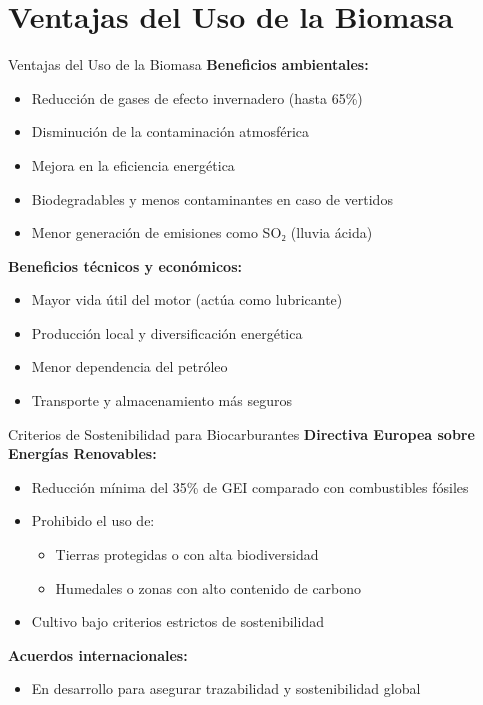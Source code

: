 \documentclass[../../main.tex]{subfiles}
\begin{document}
\section{Ventajas del Uso de la Biomasa}
\begin{frame}{Ventajas del Uso de la Biomasa}
\justifying
\textbf{Beneficios ambientales:}
\begin{itemize}
  \item Reducción de gases de efecto invernadero (hasta 65\%)
  \item Disminución de la contaminación atmosférica
  \item Mejora en la eficiencia energética
  \item Biodegradables y menos contaminantes en caso de vertidos
  \item Menor generación de emisiones como SO₂ (lluvia ácida)
\end{itemize}

\textbf{Beneficios técnicos y económicos:}
\begin{itemize}
  \item Mayor vida útil del motor (actúa como lubricante)
  \item Producción local y diversificación energética
  \item Menor dependencia del petróleo
  \item Transporte y almacenamiento más seguros
\end{itemize}
\end{frame}
\begin{frame}{Criterios de Sostenibilidad para Biocarburantes}
\justifying
\textbf{Directiva Europea sobre Energías Renovables:}
\begin{itemize}
  \item Reducción mínima del 35\% de GEI comparado con combustibles fósiles
  \item Prohibido el uso de:
    \begin{itemize}
      \item Tierras protegidas o con alta biodiversidad
      \item Humedales o zonas con alto contenido de carbono
    \end{itemize}
  \item Cultivo bajo criterios estrictos de sostenibilidad
\end{itemize}

\vspace{0.5em}
\textbf{Acuerdos internacionales:}
\begin{itemize}
  \item En desarrollo para asegurar trazabilidad y sostenibilidad global
\end{itemize}
\end{frame}
\end{document}

